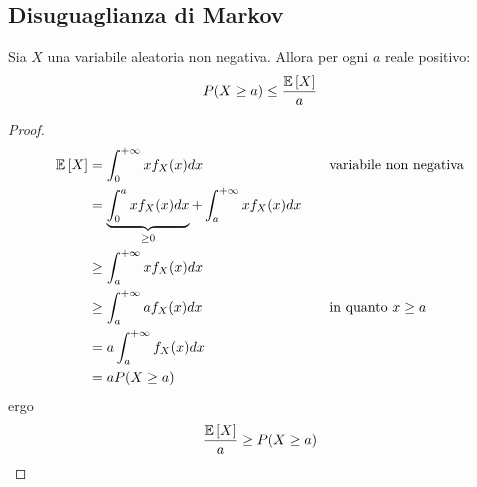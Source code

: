 \subsection{Disuguaglianza di Markov}
\begin{teor} \label{teor:markov}
	Sia $X$ una variabile aleatoria non negativa. Allora per ogni $a$ reale positivo:
	\begin{equation*}
		P(X\geq a) \leq \frac{\mathbb{E}\left[ X \right]}{a}
	\end{equation*}
\end{teor}
\begin{proof}
	\begin{align*}
		\mathbb{E}\left[ X \right] & = \int_0^{+\infty} x f_X(x) dx                  & \quad & \text{variabile non negativa} \\
		       & = \underbrace{\int_0^a x f_X(x) dx}_{\geq 0} + \int_a^{+\infty} x f_X(x) dx \\
		       & \geq \int_a^{+\infty} x f_X(x) dx                                           \\
		       & \geq \int_a^{+\infty} a f_X(x) dx                  & \quad & \text{in quanto $x\geq a$} \\
		       & = a \int_a^{+\infty} f_X(x) dx                                              \\
		       & = a P(X\geq a)
	\end{align*}
	ergo
	\begin{equation*}
		\frac{\mathbb{E}\left[ X \right]}{a}\geq P(X\geq a)
	\end{equation*}
\end{proof}



